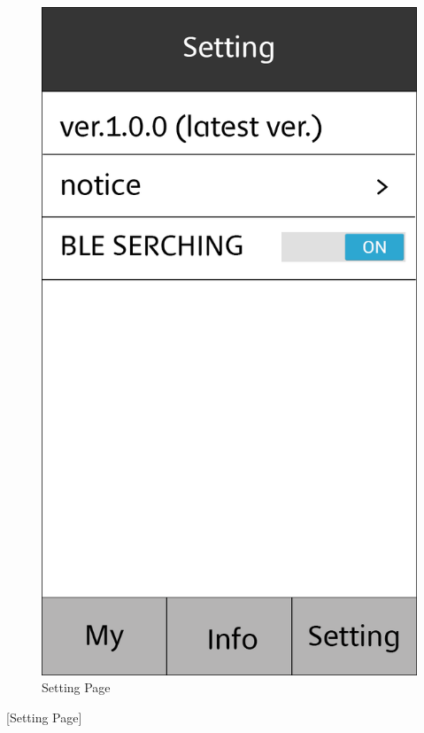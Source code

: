 \documentclass[conference]{IEEEtran}
\begin{document}
\begin{figure}[htbp]
\begin{center}
    \includegraphics[scale=0.2]{img_setting01}
    \caption{Setting Page} 
\end{center}
\end{figure}

[Setting Page]
\end{document}
